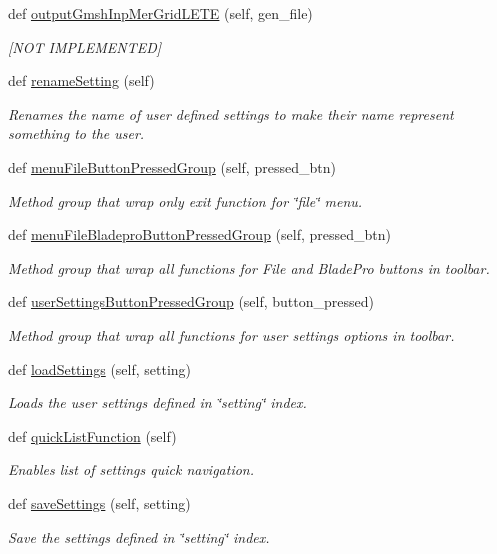 \begin{DoxyCompactItemize}
def \hyperlink{a00073_aa07573686af3bd04e4ff42c3dddcf975}{output\+Gmsh\+Inp\+Mer\+Grid\+L\+E\+TE} (self, gen\+\_\+file)
\begin{DoxyCompactList}\small\item\em \mbox{[}N\+OT I\+M\+P\+L\+E\+M\+E\+N\+T\+ED\mbox{]} \end{DoxyCompactList}\item 
def \hyperlink{a00073_a464a8ac16bcb67d41a6d91ee8b51acf2}{rename\+Setting} (self)
\begin{DoxyCompactList}\small\item\em Renames the name of user defined settings to make their name represent something to the user. \end{DoxyCompactList}\item 
def \hyperlink{a00073_a35cf87c6230239ce47b33bda03bd7432}{menu\+File\+Button\+Pressed\+Group} (self, pressed\+\_\+btn)
\begin{DoxyCompactList}\small\item\em Method group that wrap only exit function for \char`\"{}file\char`\"{} menu. \end{DoxyCompactList}\item 
def \hyperlink{a00073_ad94f49b4827a3ea0b56070e0149ae2aa}{menu\+File\+Bladepro\+Button\+Pressed\+Group} (self, pressed\+\_\+btn)
\begin{DoxyCompactList}\small\item\em Method group that wrap all functions for File and Blade\+Pro buttons in toolbar. \end{DoxyCompactList}\item 
def \hyperlink{a00073_a1b508dd4cb9c699a1769e7727d1e6fc1}{user\+Settings\+Button\+Pressed\+Group} (self, button\+\_\+pressed)
\begin{DoxyCompactList}\small\item\em Method group that wrap all functions for user settings options in toolbar. \end{DoxyCompactList}\item 
def \hyperlink{a00073_a0c4f30850537553db0ff2e27059733a4}{load\+Settings} (self, setting)
\begin{DoxyCompactList}\small\item\em Loads the user settings defined in \char`\"{}setting\char`\"{} index. \end{DoxyCompactList}\item 
def \hyperlink{a00073_a0e71786a8b6fe43e6a01ff388c34ce18}{quick\+List\+Function} (self)
\begin{DoxyCompactList}\small\item\em Enables list of settings quick navigation. \end{DoxyCompactList}\item 
def \hyperlink{a00073_a723573fade09f206a9c89569885558c1}{save\+Settings} (self, setting)
\begin{DoxyCompactList}\small\item\em Save the settings defined in \char`\"{}setting\char`\"{} index. \end{DoxyCompactList}\end{DoxyCompactItemize}
